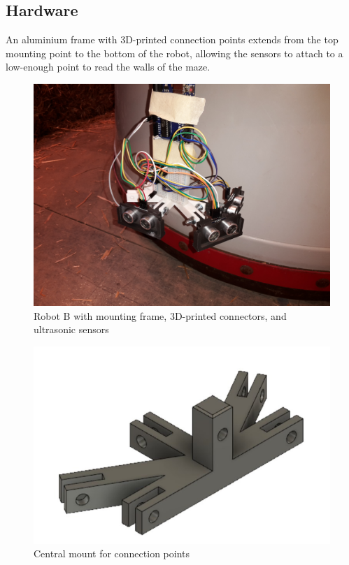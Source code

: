 \documentclass[11pt]{article}
\begin{document}
	\subsection{Hardware}
	An aluminium frame with 3D-printed connection points extends from the top mounting point to the bottom of the robot, allowing the sensors to attach to a low-enough point to read the walls of the maze.
	
	\pagebreak
	
	\begin{figure}[h!]
		\centering
		\includegraphics[scale=0.1]{ultrasonic_mount}
		\caption{Robot B with mounting frame, 3D-printed connectors, and ultrasonic sensors}
	\end{figure}
	
	\begin{figure}[h!]
		\centering
		\includegraphics[scale=0.5]{central_mount_empty}
		\caption{Central mount for connection points}
	\end{figure}
\end{document}
